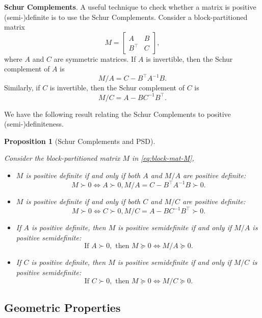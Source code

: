 \documentclass[
]{book}
\newtheorem{proposition}{Proposition}[chapter]
\theoremstyle{definition}
\theoremstyle{definition}
\theoremstyle{definition}
\theoremstyle{definition}
\theoremstyle{remark}
\begin{document}
\textbf{Schur Complements}. A useful technique to check whether a matrix is positive (semi-)definite is to use the Schur Complements. Consider a block-partitioned matrix
\begin{equation}
M = \begin{bmatrix} A & B \\ B^\top& C \end{bmatrix},
\label{eq:block-mat-M}
\end{equation}
where \(A\) and \(C\) are symmetric matrices.
If \(A\) is invertible, then the Schur complement of \(A\) is
\[
M / A = C - B^\top A^{-1}B.
\]
Similarly, if \(C\) is invertible, then the Schur complement of \(C\) is
\[
M / C = A - B C^{-1}B^\top.
\]

We have the following result relating the Schur Complements to positive (semi-)definiteness.

\begin{proposition}[Schur Complements and PSD]
\protect\hypertarget{prp:SchurPSD}{}\label{prp:SchurPSD}

Consider the block-partitioned matrix \(M\) in \eqref{eq:block-mat-M},

\begin{itemize}
\item
  \(M\) is positive definite if and only if both \(A\) and \(M/A\) are positive definite:
  \[
  M \succ 0 \Leftrightarrow A \succ 0, M/A = C - B^\top A^{-1}B \succ 0.
  \]
\item
  \(M\) is positive definite if and only if both \(C\) and \(M/C\) are positive definite:
  \[
  M \succ 0 \Leftrightarrow C \succ 0, M/C = A - B C^{-1}B^\top\succ 0.
  \]
\item
  If \(A\) is positive definite, then \(M\) is positive semidefinite if and only if \(M/A\) is positive semidefinite:
  \[
  \text{If } A \succ 0, \text{ then } M \succeq 0 \Leftrightarrow M / A \succeq 0.
  \]
\item
  If \(C\) is positive definite, then \(M\) is positive semidefinite if and only if \(M/C\) is positive semidefinite:
  \[
  \text{If } C \succ 0, \text{ then } M \succeq 0 \Leftrightarrow M / C \succeq 0.
  \]
\end{itemize}

\end{proposition}

\subsection{Geometric Properties}\label{geometric-properties}
\end{document}
